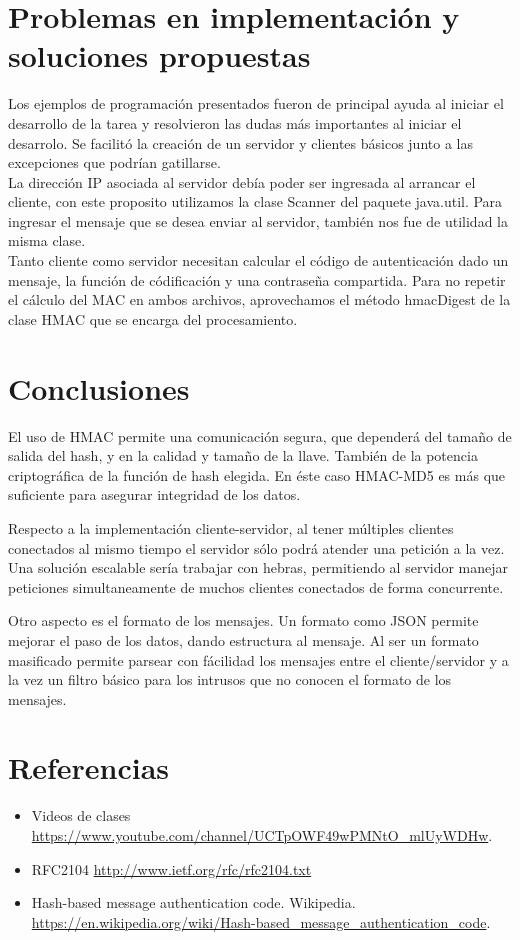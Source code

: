 \documentclass[letter, 10pt]{article}
\begin{document}
\section{Problemas en implementación y soluciones propuestas}
Los ejemplos de programación presentados fueron de principal ayuda al iniciar el desarrollo de la tarea
y resolvieron las dudas más importantes al iniciar el desarrolo. Se facilitó la creación de un servidor
y clientes básicos junto a las excepciones que podrían gatillarse. \\
La dirección IP asociada al servidor debía poder ser ingresada al arrancar el cliente, con este proposito utilizamos
la clase Scanner del paquete java.util. Para ingresar el mensaje que se desea enviar al servidor, también nos fue
de utilidad la misma clase.\\
Tanto cliente como servidor necesitan calcular el código de autenticación dado un mensaje, la función de códificación
y una contraseña compartida. Para no repetir el cálculo del MAC en ambos archivos, aprovechamos el método hmacDigest
de la clase HMAC que se encarga del procesamiento.

\newpage
\section{Conclusiones}
El uso de HMAC permite una comunicación segura, que dependerá del tamaño de salida del hash, y en la calidad
y tamaño de la llave. También de la potencia criptográfica de la función de hash elegida. En éste caso HMAC-MD5 es más que
suficiente para asegurar integridad de los datos.

Respecto a la implementación cliente-servidor, al tener múltiples clientes conectados al mismo tiempo el servidor sólo
podrá atender una petición a la vez. Una solución escalable sería trabajar con hebras, permitiendo al servidor manejar 
peticiones simultaneamente de muchos clientes conectados de forma concurrente.

Otro aspecto es el formato de los mensajes. Un formato como JSON permite mejorar el paso de los datos, dando estructura al mensaje. 
Al ser un formato masificado permite parsear con fácilidad los mensajes entre el cliente/servidor y a la vez un filtro básico
para los intrusos que no conocen el formato de los mensajes.

\section{Referencias}
\begin{itemize}
 \item Videos de clases \url{https://www.youtube.com/channel/UCTpOWF49wPMNtO_mlUyWDHw}.
 \item RFC2104 \url{http://www.ietf.org/rfc/rfc2104.txt}
 \item Hash-based message authentication code. Wikipedia. \url{https://en.wikipedia.org/wiki/Hash-based_message_authentication_code}.
\end{itemize}
\end{document}
